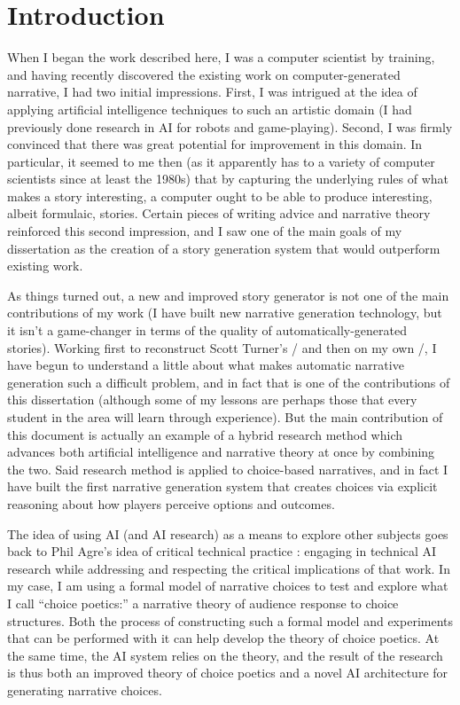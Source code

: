 \chapter{Introduction}

\label{ch:intro}

When I began the work described here, I was a computer scientist by training, and having recently discovered the existing work on computer-generated narrative, I had two initial impressions.
%
First, I was intrigued at the idea of applying artificial intelligence techniques to such an artistic domain (I had previously done research in AI for robots and game-playing).
%
Second, I was firmly convinced that there was great potential for improvement in this domain.
%
In particular, it seemed to me then (as it apparently has to a variety of computer scientists since at least the 1980s) that by capturing the underlying rules of what makes a story interesting, a computer ought to be able to produce interesting, albeit formulaic, stories.
%
Certain pieces of writing advice and narrative theory reinforced this second impression, and I saw one of the main goals of my dissertation as the creation of a story generation system that would outperform existing work.


As things turned out, a new and improved story generator is not one of the main contributions of my work (I have built new narrative generation technology, but it isn't a game-changer in terms of the quality of automatically-generated stories).
%
Working first to reconstruct Scott Turner's \minstrel/ \citep{Turner1993} and then on my own \dunyazad/, I have begun to understand a little about what makes automatic narrative generation such a difficult problem, and in fact that is one of the contributions of this dissertation (although some of my lessons are perhaps those that every student in the area will learn through experience).
%
But the main contribution of this document is actually an example of a hybrid research method which advances both artificial intelligence and narrative theory at once by combining the two.
%
Said research method is applied to choice-based narratives, and in fact I have built the first narrative generation system that creates choices via explicit reasoning about how players perceive options and outcomes.


The idea of using AI (and AI research) as a means to explore other subjects goes back to Phil Agre's idea of critical technical practice \citep{Agre1997}: engaging in technical AI research while addressing and respecting the critical implications of that work.
%
In my case, I am using a formal model of narrative choices to test and explore what I call ``choice poetics:'' a narrative theory of audience response to choice structures.
%
Both the process of constructing such a formal model and experiments that can be performed with it can help develop the theory of choice poetics.
%
At the same time, the AI system relies on the theory, and the result of the research is thus both an improved theory of choice poetics and a novel AI architecture for generating narrative choices.


